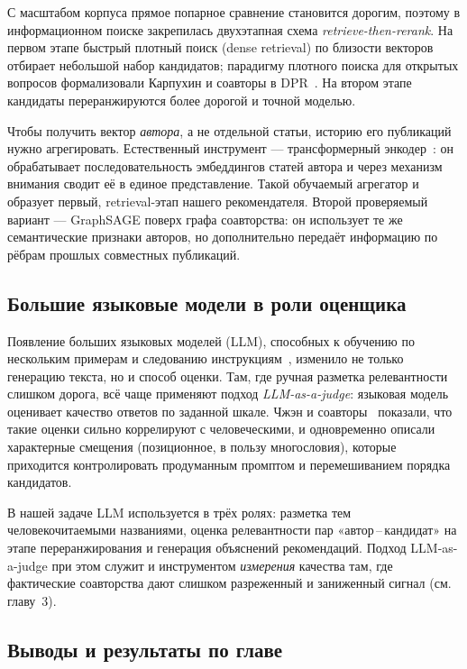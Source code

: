 С масштабом корпуса прямое попарное сравнение становится дорогим, поэтому в информационном поиске
закрепилась двухэтапная схема \emph{retrieve-then-rerank}. На первом этапе быстрый плотный поиск
(dense retrieval) по близости векторов отбирает небольшой набор кандидатов; парадигму плотного
поиска для открытых вопросов формализовали Карпухин и соавторы в DPR~\cite{karpukhin2020dpr}. На
втором этапе кандидаты переранжируются более дорогой и точной моделью.

Чтобы получить вектор \emph{автора}, а не отдельной статьи, историю его публикаций нужно
агрегировать. Естественный инструмент — трансформерный энкодер~\cite{vaswani2017attention}: он
обрабатывает последовательность эмбеддингов статей автора и через механизм внимания сводит её в
единое представление. Такой обучаемый агрегатор и образует первый, retrieval-этап нашего
рекомендателя. Второй проверяемый вариант — GraphSAGE поверх графа соавторства: он использует
те же семантические признаки авторов, но дополнительно передаёт информацию по рёбрам прошлых
совместных публикаций.

\subsection{Большие языковые модели в роли оценщика}

Появление больших языковых моделей (LLM), способных к обучению по нескольким примерам и следованию
инструкциям~\cite{brown2020gpt3}, изменило не только генерацию текста, но и способ оценки. Там, где
ручная разметка релевантности слишком дорога, всё чаще применяют подход \emph{LLM-as-a-judge}:
языковая модель оценивает качество ответов по заданной шкале. Чжэн и соавторы~\cite{zheng2023judging}
показали, что такие оценки сильно коррелируют с человеческими, и одновременно описали характерные
смещения (позиционное, в пользу многословия), которые приходится контролировать продуманным
промптом и перемешиванием порядка кандидатов.

В нашей задаче LLM используется в трёх ролях: разметка тем человекочитаемыми названиями, оценка
релевантности пар «автор\,--\,кандидат» на этапе переранжирования и генерация объяснений
рекомендаций. Подход LLM-as-a-judge при этом служит и инструментом \emph{измерения} качества там,
где фактические соавторства дают слишком разреженный и заниженный сигнал (см. главу~3).

\subsection{Выводы и результаты по главе}

